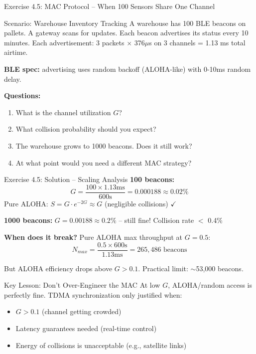 \documentclass[aspectratio=169,11pt]{beamer}
\begin{document}
\begin{frame}{Exercise 4.5: MAC Protocol -- When 100 Sensors Share One Channel}
    \begin{block}{Scenario: Warehouse Inventory Tracking}
        A warehouse has 100 BLE beacons on pallets. A gateway scans for updates. Each beacon advertises its status every 10 minutes. Each advertisement: 3 packets $\times$ 376$\mu$s on 3 channels = 1.13 ms total airtime.
        
        \vspace{0.2cm}
        \textbf{BLE spec:} advertising uses random backoff (ALOHA-like) with 0-10ms random delay.
        
        \vspace{0.2cm}
        \textbf{Questions:}
        \begin{enumerate}
            \item What is the channel utilization $G$?
            \item What collision probability should you expect?
            \item The warehouse grows to 1000 beacons. Does it still work?
            \item At what point would you need a different MAC strategy?
        \end{enumerate}
    \end{block}
\end{frame}

\begin{frame}{Exercise 4.5: Solution -- Scaling Analysis}
    \textbf{100 beacons:}
    \[
        G = \frac{100 \times 1.13\text{ms}}{600\text{s}} = 0.000188 \approx 0.02\%
    \]
    Pure ALOHA: $S = G \cdot e^{-2G} \approx G$ (negligible collisions) $\checkmark$
    
    \vspace{0.2cm}
    \textbf{1000 beacons:}
    $G = 0.00188 \approx 0.2\%$ -- still fine! Collision rate $<$ 0.4\%
    
    \vspace{0.2cm}
    \textbf{When does it break?} Pure ALOHA max throughput at $G = 0.5$:
    \[
        N_{max} = \frac{0.5 \times 600\text{s}}{1.13\text{ms}} = 265,486 \text{ beacons}
    \]
    
    But ALOHA efficiency drops above $G > 0.1$. Practical limit: $\sim$53,000 beacons.
    
    \vspace{0.2cm}
    \begin{exampleblock}{Key Lesson: Don't Over-Engineer the MAC}
        At low $G$, ALOHA/random access is perfectly fine. TDMA synchronization only justified when:
        \begin{itemize}
            \item $G > 0.1$ (channel getting crowded)
            \item Latency guarantees needed (real-time control)
            \item Energy of collisions is unacceptable (e.g., satellite links)
        \end{itemize}
    \end{exampleblock}
\end{frame}
\end{document}
